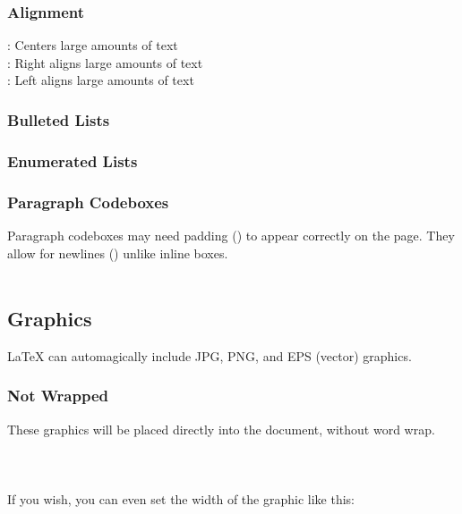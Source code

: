 \subsubsection{Alignment}
: Centers large amounts of text\\
: Right aligns large amounts of text\\
: Left aligns large amounts of text
\subsubsection{Bulleted Lists}
\subsubsection{Enumerated Lists}
\subsubsection{Paragraph Codeboxes}
Paragraph codeboxes may need padding (\code{\sla\sla\sla\sla}) to appear correctly on the page.  They allow for newlines (\code{\sla\sla}) unlike inline  boxes.
\\\\

\newpage
\subsection{Graphics}
\LaTeX{} can automagically include JPG, PNG, and EPS (vector) graphics.\\
\subsubsection{Not Wrapped}
These graphics will be placed directly into the document, without word wrap.\\\\
\\\\
If you wish, you can even set the width of the graphic like this:\\\\
\\
\\\\
